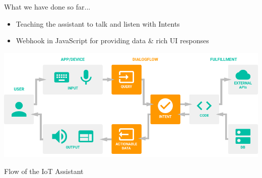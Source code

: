 \documentclass[10pt, a4paper]{beamer}
\begin{document}
\begin{frame}{What we have done so far...}
	\begin{itemize}
		\item Teaching the assistant to talk and listen with Intents
		\item Webhook in JavaScript for providing data \& rich UI responses
		\newline\\\vspace{0.3cm}				
	\end{itemize}
	\includegraphics[totalheight=4cm]{architecture.png}
	\vspace{0.3cm}
	\\\centerline{Flow of the IoT Assistant}
\end{frame}
\end{document}
